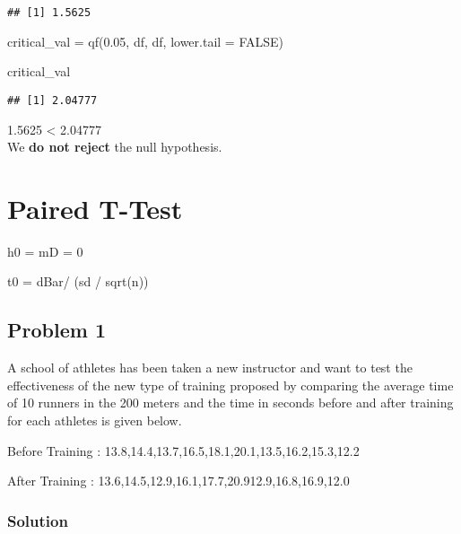 \documentclass[
]{article}
\newenvironment{Shaded}{\begin{snugshade}}{\end{snugshade}}
\newcommand{\AttributeTok}[1]{\textcolor[rgb]{0.77,0.63,0.00}{#1}}
\newcommand{\ConstantTok}[1]{\textcolor[rgb]{0.00,0.00,0.00}{#1}}
\newcommand{\FloatTok}[1]{\textcolor[rgb]{0.00,0.00,0.81}{#1}}
\newcommand{\FunctionTok}[1]{\textcolor[rgb]{0.00,0.00,0.00}{#1}}
\newcommand{\NormalTok}[1]{#1}
\newcommand{\OtherTok}[1]{\textcolor[rgb]{0.56,0.35,0.01}{#1}}
\begin{document}
\begin{verbatim}
## [1] 1.5625
\end{verbatim}

\begin{Shaded}
\begin{Highlighting}[]
\NormalTok{critical\_val }\OtherTok{=} \FunctionTok{qf}\NormalTok{(}\FloatTok{0.05}\NormalTok{, df, df, }\AttributeTok{lower.tail =} \ConstantTok{FALSE}\NormalTok{)}

\NormalTok{critical\_val}
\end{Highlighting}
\end{Shaded}

\begin{verbatim}
## [1] 2.04777
\end{verbatim}

1.5625 \textless{} 2.04777\\
We \textbf{do not reject} the null hypothesis.

\hypertarget{paired-t-test}{%
\section{Paired T-Test}\label{paired-t-test}}

h0 = mD = 0

t0 = dBar/ (sd / sqrt(n))

\hypertarget{problem-1-2}{%
\subsection{Problem 1}\label{problem-1-2}}

A school of athletes has been taken a new instructor and want to test
the effectiveness of the new type of training proposed by comparing the
average time of 10 runners in the 200 meters and the time in seconds
before and after training for each athletes is given below.

Before Training : 13.8,14.4,13.7,16.5,18.1,20.1,13.5,16.2,15.3,12.2

After Training : 13.6,14.5,12.9,16.1,17.7,20.912.9,16.8,16.9,12.0

\hypertarget{solution-22}{%
\subsubsection{Solution}\label{solution-22}}
\end{document}
